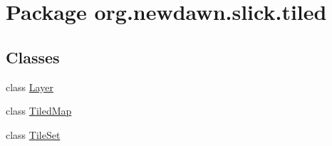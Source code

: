 \hypertarget{namespaceorg_1_1newdawn_1_1slick_1_1tiled}{}\section{Package org.\+newdawn.\+slick.\+tiled}
\label{namespaceorg_1_1newdawn_1_1slick_1_1tiled}
\subsection*{Classes}
\begin{DoxyCompactItemize}
\item 
class \mbox{\hyperlink{classorg_1_1newdawn_1_1slick_1_1tiled_1_1_layer}{Layer}}
\item 
class \mbox{\hyperlink{classorg_1_1newdawn_1_1slick_1_1tiled_1_1_tiled_map}{Tiled\+Map}}
\item 
class \mbox{\hyperlink{classorg_1_1newdawn_1_1slick_1_1tiled_1_1_tile_set}{Tile\+Set}}
\end{DoxyCompactItemize}
